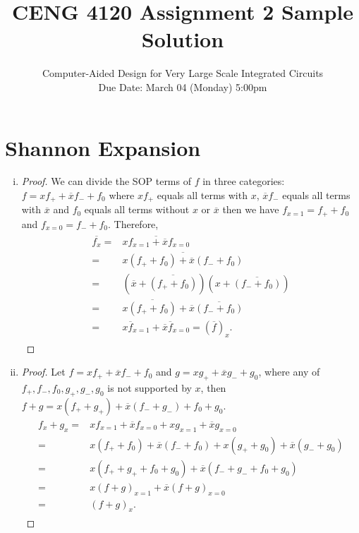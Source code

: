 \documentclass[acmlarge,screen=true,anonymous=false,11pt]{acmart}
\begin{document}
\title{CENG 4120 Assignment 2 Sample Solution}
\subtitle{Computer-Aided Design for Very Large Scale Integrated Circuits \\ Due Date: March 04 (Monday) 5:00pm}

\maketitle

\section{Shannon Expansion}
\begin{enumerate}[(i)]
    \item \begin{proof}
        We can divide the SOP terms of $f$ in three categories: $f = xf_+ + \overline{x}f_- + f_0$ where $xf_+$ equals all terms with $x$, $\overline{x}f_-$ equals all terms with $\overline{x}$ and $f_0$ equals all terms without $x$ or $\overline{x}$ then we have $f_{x = 1} = f_+ + f_0$ and $f_{x = 0} = f_- + f_0$.
        Therefore, \begin{align}
            \begin{aligned}
            \overline{f_x} = & \overline{xf_{x = 1} + \overline{x}f_{x = 0}}\\
            = & \overline{x (f_+ + f_0) + \overline{x}(f_- + f_0)}\\
            = & (\overline{x} + \overline{(f_+ + f_0)})(x + \overline{(f_- + f_0)})\\
            = & x\overline{(f_+ + f_0)} + \overline{x}\overline{(f_- + f_0)}\\
            = & x\overline{f}_{x = 1} + \overline{x}\overline{f}_{x = 0} = \left(\overline{f}\right)_x.
            \end{aligned}
        \end{align}
    \end{proof}
    \item \begin{proof}
        Let $f = xf_+ + \overline{x}f_- + f_0$ and $g = xg_+ + \overline{x}g_- + g_0$, where any of $f_+, f_-, f_0, g_+, g_-, g_0$ is not supported by $x$, then $f + g = x(f_+ + g_+) + \overline{x}(f_- + g_-) + f_0 + g_0$.
        \begin{align}
            \begin{aligned}
            f_x + g_x = & xf_{x = 1} + \overline{x}f_{x = 0} + xg_{x = 1} + \overline{x}g_{x = 0}\\
            = & x(f_+ + f_0) + \overline{x}(f_- + f_0)+ x(g_+ + g_0) + \overline{x}(g_- + g_0)\\
            = & x(f_+ + g_+ + f_0 + g_0) + \overline{x}(f_- + g_- + f_0 + g_0)\\
            = & x(f + g)_{x = 1} + \overline{x}(f + g)_{x = 0}\\
            = & \left(f + g\right)_x.
            \end{aligned}
        \end{align}
    \end{proof}
\end{enumerate}
\end{document}
